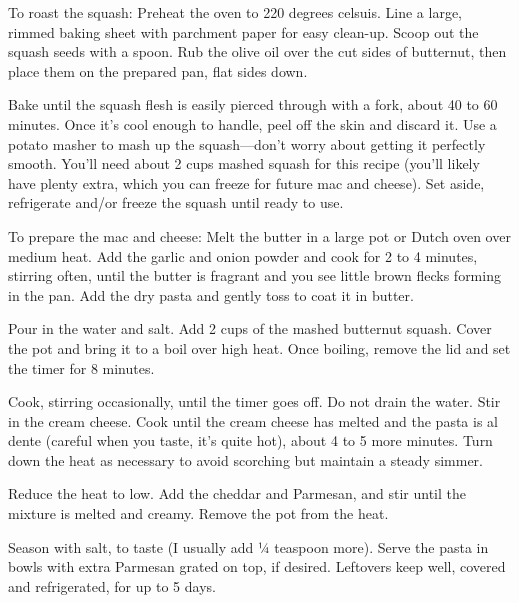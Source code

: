 \begin{method}
To roast the squash: Preheat the oven to 220 degrees celsuis. Line a
large, rimmed baking sheet with parchment paper for easy clean-up.
Scoop out the squash seeds with a spoon. Rub the olive oil over the cut
sides of butternut, then place them on the prepared pan, flat sides
down.

Bake until the squash flesh is easily pierced through with a fork, about
40 to 60 minutes. Once it’s cool enough to handle, peel off the skin
and discard it. Use a potato masher to mash up the squash—don’t
worry about getting it perfectly smooth. You’ll need about 2 cups
mashed squash for this recipe (you’ll likely have plenty extra, which
you can freeze for future mac and cheese). Set aside, refrigerate and/or
freeze the squash until ready to use.

To prepare the mac and cheese: Melt the butter in a large pot or Dutch
oven over medium heat. Add the garlic and onion powder and cook for
2 to 4 minutes, stirring often, until the butter is fragrant and you see
little brown flecks forming in the pan. Add the dry pasta and gently
toss to coat it in butter.

Pour in the water and salt. Add 2 cups of the mashed butternut squash.
Cover the pot and bring it to a boil over high heat. Once boiling,
remove the lid and set the timer for 8 minutes.

Cook, stirring occasionally, until the timer goes off. Do not drain the water. Stir in the cream cheese. Cook until the cream cheese has melted and the pasta is al dente (careful when you taste, it’s quite hot), about 4 to 5 more minutes. Turn down the heat as necessary to avoid scorching but maintain a steady simmer.

Reduce the heat to low. Add the cheddar and Parmesan, and stir until the mixture is melted and creamy. Remove the pot from the heat.

Season with salt, to taste (I usually add ¼ teaspoon more). Serve the pasta in bowls with extra Parmesan grated on top, if desired. Leftovers keep well, covered and refrigerated, for up to 5 days.
\end{method}





